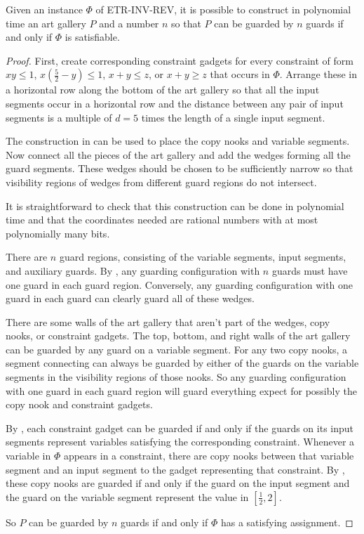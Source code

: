 \begin{lemma}
Given an instance $\Phi$ of ETR-INV-REV, it is possible to construct in polynomial time an art gallery $P$ and a number $n$ so that $P$ can be guarded by $n$ guards if and only if $\Phi$ is satisfiable.
\end{lemma}

\begin{proof}
First, create corresponding constraint gadgets for every constraint of form $xy\le 1$, $x\left(\frac{5}2-y\right)\le 1$, $x+y\le z$, or $x+y\ge z$ that occurs in $\Phi$. Arrange these in a horizontal row along the bottom of the art gallery so that all the input segments occur in a horizontal row and the distance between any pair of input segments is a multiple of $d=5$ times the length of a single input segment.

The construction in  can be used to place the copy nooks and variable segments. Now connect all the pieces of the art gallery and add the wedges forming all the guard segments. These wedges should be chosen to be sufficiently narrow so that visibility regions of wedges from different guard regions do not intersect. 

It is straightforward to check that this construction can be done in polynomial time and that the coordinates needed are rational numbers with at most polynomially many bits.

There are $n$ guard regions, consisting of the variable segments, input segments, and auxiliary guards. By , any guarding configuration with $n$ guards must have one guard in each guard region. Conversely, any guarding configuration with one guard in each guard can clearly guard all of these wedges.

There are some walls of the art gallery that aren't part of the wedges, copy nooks, or constraint gadgets. The top, bottom, and right walls of the art gallery can be guarded by any guard on a variable segment. For any two copy nooks, a segment connecting can always be guarded by either of the guards on the variable segments in the visibility regions of those nooks. So any guarding configuration with one guard in each guard region will guard everything expect for possibly the copy nook and constraint gadgets.

By , each constraint gadget can be guarded if and only if the guards on its input segments represent variables satisfying the corresponding constraint. Whenever a variable in $\Phi$ appears in a constraint, there are copy nooks between that variable segment and an input segment to the gadget representing that constraint. By , these copy nooks are guarded if and only if the guard on the input segment and the guard on the variable segment represent the value in $[\frac12, 2]$.

So $P$ can be guarded by $n$ guards if and only if $\Phi$ has a satisfying assignment. 
\end{proof}

